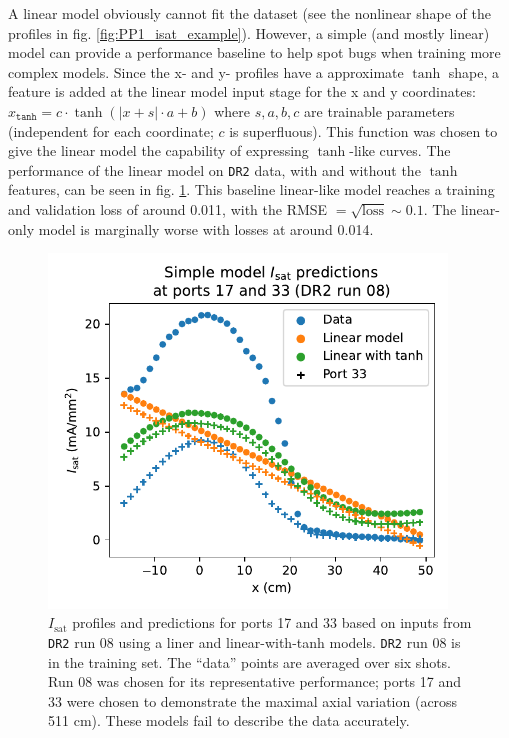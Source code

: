 A linear model obviously cannot fit the dataset (see the nonlinear shape of the profiles in fig. \ref{fig:PP1_isat_example}). However, a simple (and mostly linear) model can provide a performance baseline to help spot bugs when training more complex models. Since the x- and y- profiles have a approximate $\tanh$ shape, a feature is added at the linear model input stage for the x and y coordinates: $x_\texttt{tanh} = c \cdot \tanh\left(\left|x + s\right| \cdot a + b \right)$ where $s, a, b, c$ are trainable parameters (independent for each coordinate; $c$ is superfluous). This function was chosen to give the linear model the capability of expressing $\tanh$-like curves. The performance of the linear model on \texttt{DR2} data, with and without the $\tanh$ features, can be seen in fig. \ref{fig:PP1_linear_simple_data}. This baseline linear-like model reaches a training and validation loss of around 0.011, with the RMSE $=\sqrt{\text{loss}} \sim 0.1$. The linear-only model is marginally worse with losses at around 0.014.

\begin{figure}
	\centering
	\includegraphics[width=300pt]{figures/PP1_linear_simple_vs_data.pdf}
	\caption[Linear predictions of $I_\text{sat}$ profiles]{\label{fig:PP1_linear_simple_data}$I_\text{sat}$ profiles and predictions for ports 17 and 33 based on inputs from \texttt{DR2} run 08 using a liner and linear-with-tanh models. \texttt{DR2} run 08 is in the training set. The ``data'' points are averaged over six shots. Run 08 was chosen for its representative performance; ports 17 and 33 were chosen to demonstrate the maximal axial variation (across 511 cm). These models fail to describe the data accurately.}
\end{figure}

